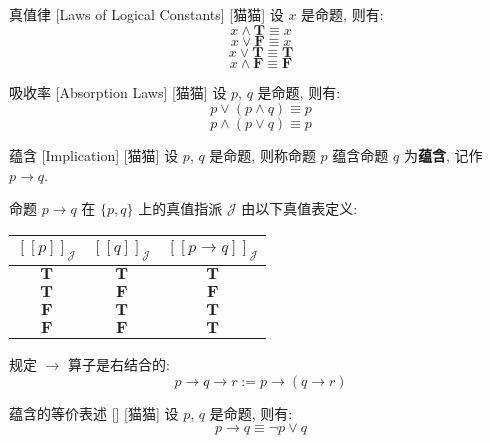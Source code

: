 \documentclass[UTF8]{ctexart}
\newcommand{\LT}{\ensuremath{\mathbf{T}}}
\newcommand{\LF}{\ensuremath{\mathbf{F}}}
\newcommand{\assign}[2]{\ensuremath{{[\![#1]\!]}_{#2}}}
\begin{document}
            \begin{ppt}
                []
                {真值律}
                [Laws of Logical Constants]
                [猫猫]
                设 \(x\) 是命题, 则有: 
                \[x\land\LT\equiv x\]
                \[x\lor\LF\equiv x\]
                \[x\lor\LT\equiv \LT\]
                \[x\land\LF\equiv \LF\]
            \end{ppt}

            \begin{ppt}
                []
                {吸收率}
                [Absorption Laws]
                [猫猫]
                设 \(p\), \(q\) 是命题, 则有: 
                \[p\lor(p\land q)\equiv p\]
                \[p\land(p\lor q)\equiv p\]
            \end{ppt}

            \begin{dfn}
                []
                {蕴含}
                [Implication]
                [猫猫]
                设 \(p\), \(q\) 是命题, 则称命题 \(p\) 蕴含命题 \(q\) 为\textbf{蕴含}, 记作 \(p\to q\). 
                
                命题 \(p\to q\) 在 \(\{p,q\}\) 上的真值指派 \(\mathcal{J}\) 由以下真值表定义: 
                \begin{center}
                \begin{tabular}{|c|c|c|}
                    \hline
                    \(\assign{p}{\mathcal{J}}\) & \(\assign{q}{\mathcal{J}}\) & \(\assign{p\to q}{\mathcal{J}}\) \\
                    \hline
                    \LT & \LT & \LT \\
                    \LT & \LF & \LF \\
                    \LF & \LT & \LT \\
                    \LF & \LF & \LT \\
                    \hline
                \end{tabular}
                \end{center}

                规定 \(\to\) 算子是右结合的: 
                \[p\to q\to r:=p\to(q\to r)\]
            \end{dfn}

            \begin{ppt}
                []
                {蕴含的等价表述}
                []
                [猫猫]
                设 \(p\), \(q\) 是命题, 则有: 
                \[p\to q\equiv\neg p\lor q\]
            \end{ppt}
\end{document}
